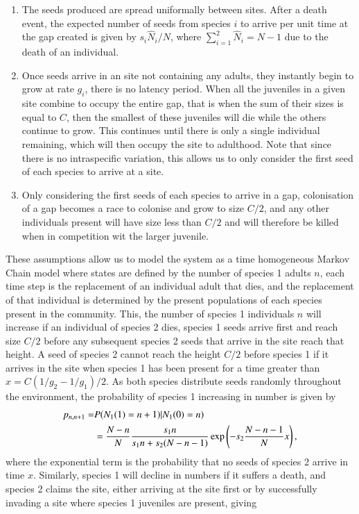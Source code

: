 \documentclass[a4paper]{article}
\begin{document}
\begin{enumerate}
\item The seeds produced are spread uniformally between sites. After a death event, the expected number of seeds from species $i$ to arrive per unit time at the gap created is given by $s_i \hat{N}_i /N$, where $\sum_{i=1}^2 \hat{N}_i =N-1$ due to the death of an individual.
\item Once seeds arrive in an site not containing any adults, they instantly begin to grow at rate $g_i$, there is no latency period. When all the juveniles in a given site combine to occupy the entire gap, that is when the sum of their sizes is equal to $C$, then the smallest of these juveniles will die while the others continue to grow. This continues until there is only a single individual remaining, which will then occupy the site to adulthood. Note that since there is no intraspecific variation, this allows us to only consider the first seed of each species to arrive at a site.
\item Only considering the first seeds of each species to arrive in a gap, colonisation of a gap becomes a race to colonise and grow to size $C/2$, and any other individuals present will have size less than $C/2$ and will therefore be killed when in competition wit the larger juvenile.
\end{enumerate}
These assumptions allow us to model the system as a time homogeneous Markov Chain model where states are defined by the number of species 1 adults $n$, each time step is the replacement of an individual adult that dies, and the replacement of that individual is determined by the present populations of each species present in the community. This, the number of species 1 individuals $n$ will increase if an individual of species 2 dies, species 1 seeds arrive first and reach size $C/2$ before any subsequent species 2 seeds that arrive in the site reach that height. A seed of species 2 cannot reach the height $C/2$ before species 1 if it arrives in the site when species 1 has been present for a time greater than $x=C(1/g_2-1/g_1)/2$. As both species distribute seeds randomly throughout the environment, the probability of species 1 increasing in number is given by
\begin{align}
\label{increase}
p_{n,n+1}=&P(N_1(1)=n+1)|N_1(0)=n) \\
&=\frac{N-n}{N}\frac{s_1 n}{s_1 n +s_2(N-n-1)}\exp \left( -s_2 \frac{N-n-1}{N} x\right),\notag \end{align}
where the exponential term is the probability that no seeds of species 2 arrive in time $x$. Similarly, species 1 will decline in numbers if it suffers a death, and species 2 claims the site, either arriving at the site first or by successfully invading a site where species 1 juveniles are present, giving
\end{document}
